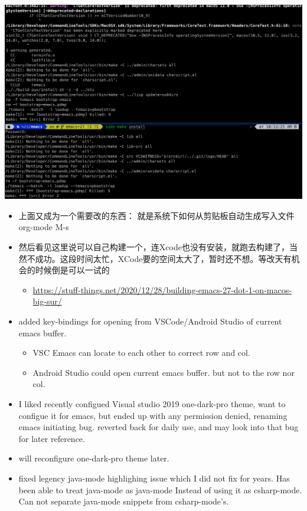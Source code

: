 \documentclass[9pt, b5paper]{article}
\begin{document}
\includegraphics[width=.9\linewidth]{./pic/readme_20230208_102317.png}
\begin{itemize}
\item 上面又成为一个需要改的东西： 就是系统下如何从剪贴板自动生成写入文件 org-mode M-s
\item 然后看见这里说可以自己构建一个，连Xcode也没有安装，就跑去构建了，当然不成功。这段时间太忙，XCode要的空间太大了，暂时还不想。等改天有机会的时候倒是可以一试的
\begin{itemize}
\item \url{https://stuff-things.net/2020/12/28/building-emacs-27-dot-1-on-macos-big-sur/}
\end{itemize}
\item added key-bindings for opening from VSCode/Android Studio of current emacs buffer. 
\begin{itemize}
\item VSC Emacs can locate to each other to correct row and col.
\item Android Studio could open current emacs buffer. but not to the row nor col.
\end{itemize}
\item I liked recently configued Visual studio 2019 one-dark-pro theme, want to configue it for emacs, but ended up with any permission denied, renaming emacs initiating bug. reverted back for daily use, and may look into that bug for later reference.
\item will reconfigure one-dark-pro theme later.
\item fixed legency java-mode highlighing issue which I did not fix for years. Has been able to treat java-mode as java-mode Instead of using it as csharp-mode. Can not separate java-mode snippets from csharp-mode's.
\end{itemize}
\end{document}
